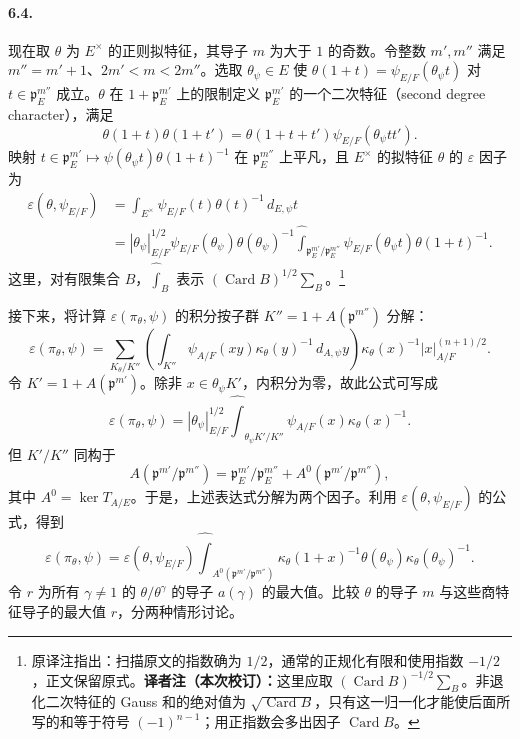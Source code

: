 \paragraph*{6.4.}现在取 $\theta$ 为 $E^\times$ 的正则拟特征，其导子 $m$ 为大于 $1$ 的奇数。令整数 $m',m''$ 满足 $m''=m'+1$、$2m'<m<2m''$。选取 $\theta_\psi\in E$ 使 $\theta(1+t)=\psi_{E/F}(\theta_\psi t)$ 对 $t\in\mathfrak p_E^{m''}$ 成立。$\theta$ 在 $1+\mathfrak p_E^{m'}$ 上的限制定义 $\mathfrak p_E^{m'}$ 的一个二次特征（second degree character），满足
\[
\theta(1+t)\theta(1+t')=\theta(1+t+t')\psi_{E/F}(\theta_\psi tt').
\]
映射 $t\in\mathfrak p_E^{m'}\mapsto\psi(\theta_\psi t)\theta(1+t)^{-1}$ 在 $\mathfrak p_E^{m''}$ 上平凡，且 $E^\times$ 的拟特征 $\theta$ 的 $\varepsilon$ 因子为
\[
\begin{aligned}
\varepsilon(\theta,\psi_{E/F})
&=\int_{E^\times}\psi_{E/F}(t)\theta(t)^{-1}\,d_{E,\psi}t\\
&=|\theta_\psi|_{E/F}^{1/2}\psi_{E/F}(\theta_\psi)\theta(\theta_\psi)^{-1}
\widehat{\int}_{\mathfrak p_E^{m'}/\mathfrak p_E^{m''}}
\psi_{E/F}(\theta_\psi t)\theta(1+t)^{-1}.
\end{aligned}
\]
这里，对有限集合 $B$，$\widehat{\int}_B$ 表示 $(\operatorname{Card}B)^{1/2}\sum_B$。\footnote{原译注指出：扫描原文的指数确为 $1/2$，通常的正规化有限和使用指数 $-1/2$，正文保留原式。\textbf{译者注（本次校订）：}这里应取 $(\operatorname{Card}B)^{-1/2}\sum_B$。非退化二次特征的 Gauss 和的绝对值为 $\sqrt{\operatorname{Card}B}$，只有这一归一化才能使后面所写的和等于符号 $(-1)^{n-1}$；用正指数会多出因子 $\operatorname{Card}B$。}

接下来，将计算 $\varepsilon(\pi_\theta,\psi)$ 的积分按子群 $K''=1+A(\mathfrak p^{m''})$ 分解：
\[
\varepsilon(\pi_\theta,\psi)=\sum_{K_\theta/K''}
\left(\int_{K''}\psi_{A/F}(xy)\kappa_\theta(y)^{-1}\,d_{A,\psi}y\right)
\kappa_\theta(x)^{-1}|x|_{A/F}^{(n+1)/2}.
\]
令 $K'=1+A(\mathfrak p^{m'})$。除非 $x\in\theta_\psi K'$，内积分为零，故此公式可写成
\[
\varepsilon(\pi_\theta,\psi)=|\theta_\psi|_{E/F}^{1/2}
\widehat{\int}_{\theta_\psi K'/K''}\psi_{A/F}(x)\kappa_\theta(x)^{-1}.
\]
但 $K'/K''$ 同构于
\[
A(\mathfrak p^{m'}/\mathfrak p^{m''})=\mathfrak p_E^{m'}/\mathfrak p_E^{m''}+A^0(\mathfrak p^{m'}/\mathfrak p^{m''}),
\]
其中 $A^0=\ker T_{A/E}$。于是，上述表达式分解为两个因子。利用 $\varepsilon(\theta,\psi_{E/F})$ 的公式，得到
\[
\varepsilon(\pi_\theta,\psi)=\varepsilon(\theta,\psi_{E/F})
\widehat{\int}_{A^0(\mathfrak p^{m'}/\mathfrak p^{m''})}
\kappa_\theta(1+x)^{-1}\theta(\theta_\psi)\kappa_\theta(\theta_\psi)^{-1}.
\]
令 $r$ 为所有 $\gamma\ne1$ 的 $\theta/\theta^\gamma$ 的导子 $a(\gamma)$ 的最大值。比较 $\theta$ 的导子 $m$ 与这些商特征导子的最大值 $r$，分两种情形讨论。

